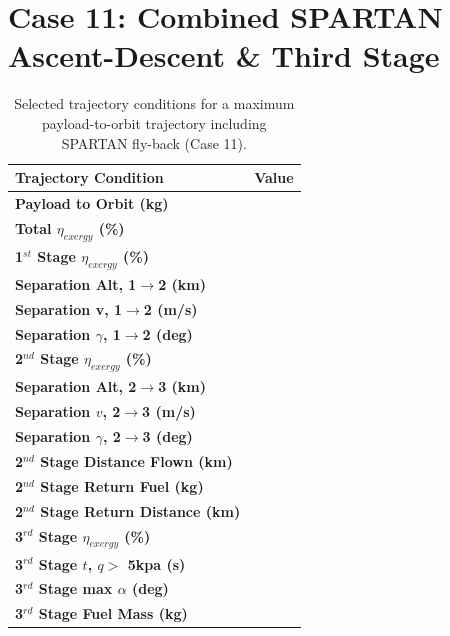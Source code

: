 \section{Case 11: Combined SPARTAN Ascent-Descent \& Third Stage}
\begin{table}[ht]
	\centering
\begin{tabular}{l c } 
	\hline \textbf{Trajectory Condition}
	&Value 
	\\
	\hline \textbf{Payload to Orbit (kg)}
	& \textbf{\PayloadToOrbitStandard}
	\\
	\textbf{Total $\eta_{exergy}$ (\%)}
	& \textbf{\totalExergyEffStandard}
	\\
	\hline 
	\textbf{1$^{st}$ Stage $\eta_{exergy}$ (\%)}
	& \textbf{\firstExergyEffStandard}
	\\

	\textbf{Separation Alt, 1$\rightarrow$2 (km)}
	& \firstsecondSeparationAltStandard
	\\
	\textbf{Separation v, 1$\rightarrow$2 (m/s)}
	& \firstsecondSeparationvStandard
	\\
	\textbf{Separation $\gamma$, 1$\rightarrow$2 (deg)}
	& \firstsecondSeparationgammaStandard
	\\
	\hline 
	\textbf{2$^{nd}$ Stage $\eta_{exergy}$ (\%)}
	& \textbf{\secondExergyEffStandard}
	\\

	\textbf{Separation Alt, 2$\rightarrow$3 (km)}
	& \secondthirdSeparationAltStandard
	\\
	\textbf{Separation $v$, 2$\rightarrow$3 (m/s)}
	& \secondthirdSeparationvStandard
	\\
	\textbf{Separation $\gamma$, 2$\rightarrow$3 (deg)}
	& \secondthirdSeparationgammaStandard
	\\

	\textbf{2$^{nd}$ Stage Distance Flown (km)}
	& \SecondDistStandard
	\\
	\textbf{2$^{nd}$ Stage Return Fuel (kg)}
	& \returnFuelStandard
	\\
	\textbf{2$^{nd}$ Stage Return Distance (km)}
	& \returnDistStandard
	\\
	\hline 
	\textbf{3$^{rd}$ Stage $\eta_{exergy}$ (\%)}
	& \textbf{\thirddExergyEffStandard}
	\\

	\textbf{3$^{rd}$ Stage $t$, $q >$ 5kpa (s)}
	& \thirdqOverFiveStandard
	\\
	\textbf{3$^{rd}$ Stage max $\alpha$ (deg)}
	& \thirdmaxAoAStandard
	\\
	\textbf{3$^{rd}$ Stage Fuel Mass (kg)}
	& \thirdmFuelStandard
	\\
	\hline 
\end{tabular} 
\caption{Selected trajectory conditions for a maximum payload-to-orbit trajectory including SPARTAN fly-back (Case 11).}
\end{table}

